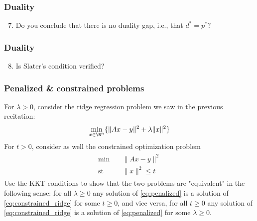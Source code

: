 \documentclass{beamer}
\begin{document}
\begin{frame}[t] 
\frametitle{Duality}
\vspace{-5pt}
\begin{enumerate}
\setcounter{enumi}{6}
\item Do you conclude that there is no duality gap, i.e., that $d^* = p^*$?
\end{enumerate}
\end{frame}

\begin{frame}[t] 
\frametitle{Duality}
\vspace{-5pt}
\begin{enumerate}
\setcounter{enumi}{7}
\item Is Slater's condition verified?
\end{enumerate}
\end{frame}

\begin{frame}[t] 
\frametitle{Penalized \& constrained problems}
\vspace{-5pt}
For $\lambda > 0$, consider the ridge regression problem we saw in the previous recitation:
\vspace{-5pt}
\begin{align} \label{eq:penalized}
\min_{x \in \R^n} \{ \|Ax - y\|^2 + \lambda \|x\|^2 \}
\end{align}
For $t > 0$, consider as well the constrained optimization problem 
\begin{align}
\begin{split} \label{eq:constrained_ridge}
\min \quad &\|Ax - y\|^2 \\
\text{st} \quad &\|x\|^2 \leq t
\end{split}
\end{align}
Use the KKT conditions to show that the two problems are "equivalent" in the following sense: for all $\lambda \geq 0$ any solution of \eqref{eq:penalized} is a solution of \eqref{eq:constrained_ridge} for some $t \geq 0$, and vice versa, for all $t \geq 0$ any solution of \eqref{eq:constrained_ridge} is a solution of \eqref{eq:penalized} for some $\lambda \geq 0$.
\end{frame}


\begin{frame}[t]
\pause
\pause
\pause
\pause
\end{frame}
\end{document}
